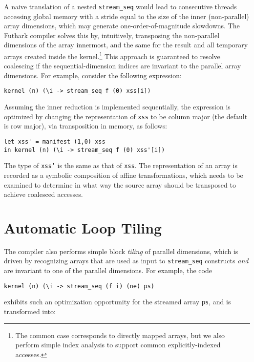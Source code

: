 A naive translation of a nested \lstinline{stream_seq} would lead to
consecutive threads accessing global memory with a stride equal to the
size of the inner (non-parallel) array dimensions, which may generate
one-order-of-magnitude slowdowns.
%
The Futhark compiler solves this by, intuitively, transposing the
non-parallel dimensions of the array innermost, and the same for the
result and all temporary arrays created inside the kernel.\footnote{
  The common case corresponds to directly mapped arrays, but we also
  perform simple index analysis to support common explicitly-indexed
  accesses.  }  This approach is guaranteed to resolve coalescing if
the sequential-dimension indices are invariant to the parallel array
dimensions. For example, consider the following expression:
\begin{lstlisting}[xleftmargin=0.5cm,numbers=none]
kernel (n) (\i -> stream_seq f (0) xss[i])
\end{lstlisting}
Assuming the inner reduction is implemented sequentially, the expression is optimized
by changing the representation of \texttt{xss} to be column major (the
default is row major), via transposition in memory, as follows:
\begin{lstlisting}[xleftmargin=0.5cm,numbers=none]
let xss' = manifest (1,0) xss
in kernel (n) (\i -> stream_seq f (0) xss'[i])
\end{lstlisting}

\noindent
The type of \texttt{xss'} is the same as that of \texttt{xss}.  The
representation of an array is recorded as a symbolic composition of
affine transformations, which needs to be examined to determine in
what way the source array should be transposed to achieve coalesced
accesses.

\section{Automatic Loop Tiling}
\label{sec:automatic-tiling}

The compiler also performs simple block \textit{tiling} of parallel
dimensions, which is driven by recognizing arrays that are used as
input to \lstinline{stream_seq} constructs \textit{and} are invariant
to one of the parallel dimensions.  For example, the code
\begin{lstlisting}[xleftmargin=0.5cm]
kernel (n) (\i -> stream_seq (f i) (ne) ps)
\end{lstlisting}

\noindent exhibits such an optimization opportunity for the streamed
array \lstinline{ps}, and is transformed into:

